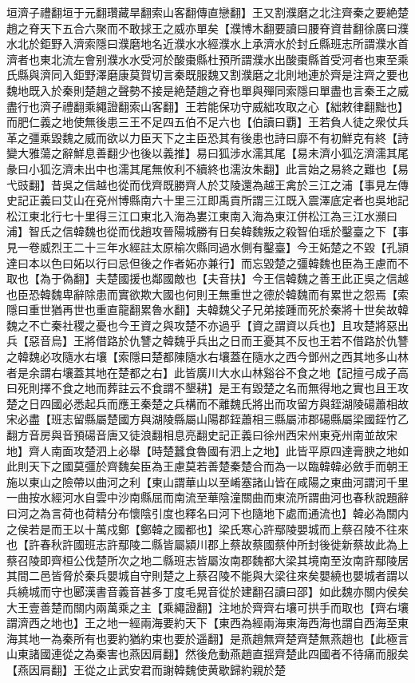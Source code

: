 垣濟子禮翻垣于元翻瓚藏旱翻索山客翻傳直戀翻】王又割濮磨之北注齊秦之要絶楚趙之脊天下五合六聚而不敢捄王之威亦單矣【濮博木翻要讀曰腰脊資昔翻徐廣曰濮水北於鉅野入濟索隱曰濮磨地名近濮水水經濮水上承濟水於封丘縣班志所謂濮水首濟者也東北流左會别濮水水受河於酸棗縣杜預所謂濮水出酸棗縣首受河者也東至乘氏縣與濟同入鉅野澤磨康莫賀切言秦既服魏又割濮磨之北則地連於齊是注齊之要也魏地既入於秦則楚趙之聲勢不接是絶楚趙之脊也單與殫同索隱曰單盡也言秦王之威盡行也濟子禮翻乘繩證翻索山客翻】王若能保功守威絀攻取之心【絀敕律翻黜也】而肥仁義之地使無後患三王不足四五伯不足六也【伯讀曰覇】王若負人徒之衆仗兵革之彊乘毀魏之威而欲以力臣天下之主臣恐其有後患也詩曰靡不有初鮮克有終【詩變大雅蕩之辭鮮息善翻少也後以義推】易曰狐涉水濡其尾【易未濟小狐汔濟濡其尾彖曰小狐汔濟未出中也濡其尾無攸利不續終也濡汝朱翻】此言始之易終之難也【易弋豉翻】昔吳之信越也從而伐齊既勝齊人於艾陵還為越王禽於三江之浦【事見左傳史記正義曰艾山在兗州博縣南六十里三江即禹貢所謂三江既入震澤底定者也吳地記松江東北行七十里得三江口東北入海為婁江東南入海為東江併松江為三江水瀕曰浦】智氏之信韓魏也從而伐趙攻晉陽城勝有日矣韓魏叛之殺智伯瑶於鑿臺之下【事見一卷威烈王二十三年水經註太原榆次縣同過水側有鑿臺】今王妬楚之不毀【孔頴達曰本以色曰妬以行曰忌但後之作者妬亦兼行】而忘毀楚之彊韓魏也臣為王慮而不取也【為于偽翻】夫楚國援也鄰國敵也【夫音扶】今王信韓魏之善王此正吳之信越也臣恐韓魏卑辭除患而實欲欺大國也何則王無重世之德於韓魏而有累世之怨焉【索隱曰重世猶再世也重直龍翻累魯水翻】夫韓魏父子兄弟接踵而死於秦將十世矣故韓魏之不亡秦社稷之憂也今王資之與攻楚不亦過乎【資之謂資以兵也】且攻楚將惡出兵【惡音烏】王將借路於仇讐之韓魏乎兵出之日而王憂其不反也王若不借路於仇讐之韓魏必攻隨水右壤【索隱曰楚都陳隨水右壤蓋在隨水之西今鄧州之西其地多山林者是余謂右壤蓋其地在楚都之右】此皆廣川大水山林谿谷不食之地【記擅弓成子高曰死則擇不食之地而葬註云不食謂不墾耕】是王有毀楚之名而無得地之實也且王攻楚之日四國必悉起兵而應王秦楚之兵構而不離魏氏將出而攻留方與銍湖陵碭蕭相故宋必盡【班志留縣屬楚國方與湖陵縣屬山陽郡銍蕭相三縣屬沛郡碭縣屬梁國銍竹乙翻方音房與音預碭音唐又徒浪翻相息亮翻史記正義曰徐州西宋州東兗州南並故宋地】齊人南面攻楚泗上必舉【時楚蠶食魯國有泗上之地】此皆平原四達膏腴之地如此則天下之國莫彊於齊魏矣臣為王慮莫若善楚秦楚合而為一以臨韓韓必斂手而朝王施以東山之險帶以曲河之利【東山謂華山以至崤塞諸山皆在咸陽之東曲河謂河千里一曲按水經河水自雲中沙南縣屈而南流至華陰潼關曲而東流所謂曲河也春秋說題辭曰河之為言荷也荷精分布懷陰引度也釋名曰河下也隨地下處而通流也】韓必為關内之侯若是而王以十萬戍鄭【鄭韓之國都也】梁氏寒心許鄢陵嬰城而上蔡召陵不往來也【許春秋許國班志許鄢陵二縣皆屬潁川郡上蔡故蔡國蔡仲所封後徙新蔡故此為上蔡召陵即齊桓公伐楚所次之地二縣班志皆屬汝南郡魏都大梁其境南至汝南許鄢陵居其間二邑皆脅於秦兵嬰城自守則楚之上蔡召陵不能與大梁往來矣嬰繞也嬰城者謂以兵繞城而守也郾漢書音義音甚多丁度毛晃音從於建翻召讀曰邵】如此魏亦關内侯矣大王壹善楚而關内兩萬乘之主【乘繩證翻】注地於齊齊右壤可拱手而取也【齊右壤謂濟西之地也】王之地一經兩海要約天下【東西為經兩海東海西海也謂自西海至東海其地一為秦所有也要約猶約束也要於遥翻】是燕趙無齊楚齊楚無燕趙也【此極言山東諸國連從之為秦害也燕因肩翻】然後危動燕趙直揺齊楚此四國者不待痛而服矣【燕因肩翻】王從之止武安君而謝韓魏使黄歇歸約親於楚

